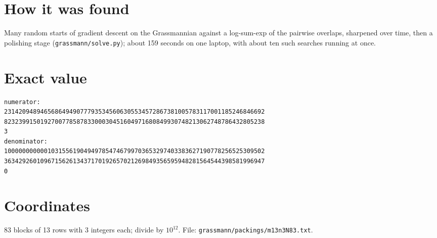 \documentclass[11pt,a4paper]{article}
\begin{document}
\section{How it was found}
Many random starts of gradient descent on the Grassmannian against a log-sum-exp of the pairwise overlaps, sharpened over time, then a polishing stage (\texttt{grassmann/solve.py}); about 159 seconds on one laptop, with about ten such searches running at once.


\appendix
\section{Exact value}
{\small
\begin{verbatim}
numerator:
231420948946568649490777935345606305534572867381005783117001185246846692
823239915019270077858783300030451604971680849930748213062748786432805238
3
denominator:
100000000000103155619049497854746799703653297403383627190778256525309502
363429260109671562613437170192657021269849356595948281564544398581996947
0
\end{verbatim}}

\section{Coordinates}
83 blocks of 13 rows with 3 integers each; divide by $10^{12}$. File: \texttt{grassmann/packings/m13n3N83.txt}.
{\tiny
\begin{multicols}{3}
\end{multicols}}
\end{document}
